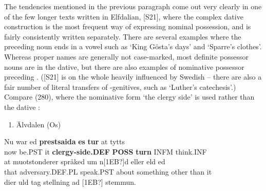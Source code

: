 The tendencies mentioned in the previous paragraph come out very clearly in one of the few longer texts written in Elfdalian, [S21], where the complex dative construction is the most frequent way of expressing nominal possession, and  is fairly consistently written separately. There are several examples where the preceding noun ends in a vowel such as  ‘King Gösta’s days’ and  ‘Sparre’s clothes’. Whereas proper names are generally not case-marked, most definite possessor nouns are in the dative, but there are also examples of nominative possessor preceding . ([S21] is on the whole heavily influenced by Swedish – there are also a fair number of literal transfers of -genitives, such as ‘Luther’s catechesis’.) Compare (280), where the nominative form  ‘the clergy side’ is used rather than the dative :

\begin{enumerate} %
\item 
\label{bkm:Ref135470135}Älvdalen (Os)

\end{enumerate} %
\ea\label{}
\gll Nu  war  ed  \textbf{prestsaida} \textbf{es} \textbf{tur} at  tytts\\


now  be.PST  it  \textbf{clergy-side.DEF} \textbf{POSS} \textbf{turn} INFM  think.INF\\ %


\ea\label{}
\gll at  muotstonderer  språked  um  n[1EB?]d  eller  eld  ed\\


that  adversary.DEF.PL  speak.PST  about  something  other  than  it\\ %


\ea\label{}
\gll dier  uld  tag  stellning  ad  [1EB?]  stemmun.\\



